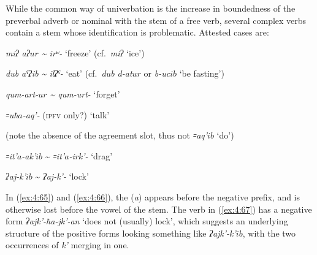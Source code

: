 \documentclass[output=paper]{langsci/langscibook}
\begin{document}
While the common way of univerbation is the increase in boundedness of
the preverbal adverb or nominal with the stem of a free
verb, several complex verbs contain a stem whose identification is
problematic. Attested cases are:

\ea %
\emph{miʔ aʔ\(ur\) \textasciitilde{} irʷ-} `freeze' (cf.\ \emph{miʔ}
`ice')

\ex %
\emph{dub aˤʡib \textasciitilde{} ilʡˤ-} `eat' (cf.\ \emph{dub d-at\(ur\)} or \emph{b-uc\(ib\)} `be fasting')

\ex %
\emph{qum-art-\(ur\) \textasciitilde{} qum-urt-}
`forget'

\ex \label{ex:4:65} %
\emph{꞊uħ\(a\)-aq'-} (\textsc{ipfv} only?) `talk'

(note the absence of the agreement slot, thus not \emph{꞊aq'\(ib\)} `do')

\ex \label{ex:4:66} %
\emph{꞊it'\(a\)-ak'\(ib\)} \textasciitilde{} \emph{꞊it'\(a\)-irk'-} `drag'

\ex \label{ex:4:67} %
\emph{ʡaj-k'\(ib\)} \textasciitilde{} \emph{ʡaj-k'-} `lock'
\z

In (\ref{ex:4:65}) and (\ref{ex:4:66}), the (\emph{a}) appears before the negative prefix,
and is otherwise lost before the vowel of the stem. The verb in (\ref{ex:4:67}) has a negative form  \emph{ʡajk'-ħa-jk'-an} `does not (usually) lock', which suggests an underlying structure of the positive forms looking something like \emph{ʡajk'-k'\(ib\)}, with the two occurrences of \emph{k'} merging in one.
\end{document}
